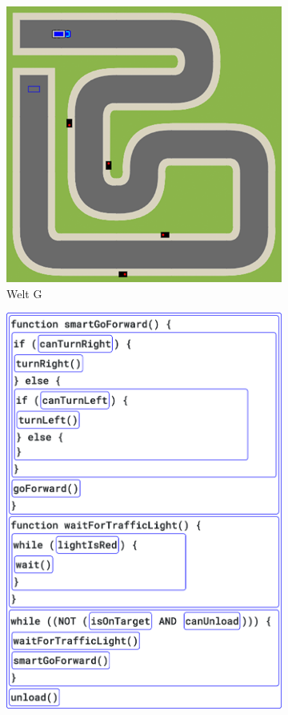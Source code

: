 \begin{figure}[H]
  \begin{subfigure}[b]{0.40\textwidth}
    \includegraphics[width=\textwidth]{gfx/exercises-world-g.png}
    \caption{Welt G}
  \end{subfigure}\hfill
  \begin{subfigure}[b]{0.40\textwidth}
    \includegraphics[width=\textwidth]{gfx/exercises-program-8.png}

\end{subfigure}
\end{figure}
